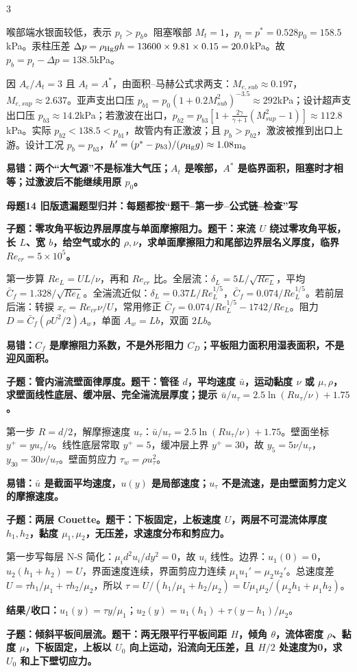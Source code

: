 \documentclass[a4paper]{article}
\newcommand{\mt}[1]{\vspace{0.22pt}\colorbox{M}{\parbox{\dimexpr\linewidth-2\fboxsep}{\color{white}\bfseries #1}}\par}
\newcommand{\qt}[1]{\vspace{0.10pt}\colorbox{Q}{\parbox{\dimexpr\linewidth-2\fboxsep}{\color{white}\bfseries #1}}\par}
\newcommand{\ans}[1]{\colorbox{G}{\parbox{\dimexpr\linewidth-2\fboxsep}{#1}}\par}
\newcommand{\warn}[1]{\colorbox{Y}{\parbox{\dimexpr\linewidth-2\fboxsep}{\color{E}\bfseries #1}}\par}
\newcommand{\res}[1]{{\color{E}\bfseries 结果/收口：}#1\par}
\begin{document}
\begin{multicols}{3}
\ans{喉部端水银面较低，表示 $p_t>p_b$。阻塞喉部 $M_t=1$，$p_t=p^*=0.528p_0=158.5$kPa。汞柱压差 $\Delta p=\rho_{\rm Hg}gh=13600\times9.81\times0.15=20.0$kPa。故 $p_b=p_t-\Delta p=138.5$kPa。}
\ans{因 $A_e/A_t=3$ 且 $A_t=A^*$，由面积--马赫公式求两支：$M_{e,sub}\approx0.197$，$M_{e,sup}\approx2.637$。亚声支出口压 $p_{b1}=p_0(1+0.2M_{sub}^2)^{-3.5}\approx292$kPa；设计超声支出口压 $p_{b3}\approx14.2$kPa；若激波在出口，$p_{b2}=p_{b3}[1+\frac{2\gamma}{\gamma+1}(M_{sup}^2-1)]\approx112.8$kPa。实际 $p_{b2}<138.5<p_{b1}$，故管内有正激波；且 $p_b>p_{b2}$，激波被推到出口上游。设计工况 $p_b=p_{b3}$，$h'=(p^*-p_{b3})/(\rho_{\rm Hg}g)\approx1.08$m。}
\warn{易错：两个“大气源”不是标准大气压；$A_t$ 是喉部，$A^*$ 是临界面积，阻塞时才相等；过激波后不能继续用原 $p_0$。}

\mt{母题14 旧版遗漏题型归并：每题都按“题干--第一步--公式链--检查”写}
\qt{子题：零攻角平板边界层厚度与单面摩擦阻力。题干：来流 $U$ 绕过零攻角平板，长 $L$、宽 $b$，给空气或水的 $\rho,\nu$，求单面摩擦阻力和尾部边界层名义厚度，临界 $Re_{cr}=5\times10^5$。}
\ans{第一步算 $Re_L=UL/\nu$，再和 $Re_{cr}$ 比。全层流：$\delta_L=5L/\sqrt{Re_L}$，平均 $\bar C_f=1.328/\sqrt{Re_L}$。全湍流近似：$\delta_L=0.37L/Re_L^{1/5}$，$\bar C_f=0.074/Re_L^{1/5}$。若前层后湍：转捩 $x_c=Re_{cr}\nu/U$，常用修正 $\bar C_f=0.074/Re_L^{1/5}-1742/Re_L$。阻力 $D=\bar C_f(\rho U^2/2)A_w$，单面 $A_w=Lb$，双面 $2Lb$。}
\warn{易错：$C_f$ 是摩擦阻力系数，不是外形阻力 $C_D$；平板阻力面积用湿表面积，不是迎风面积。}
\qt{子题：管内湍流壁面律厚度。题干：管径 $d$，平均速度 $\bar u$，运动黏度 $\nu$ 或 $\mu,\rho$，求壁面线性底层、缓冲层、完全湍流层厚度；提示 $\bar u/u_\tau=2.5\ln(Ru_\tau/\nu)+1.75$。}
\ans{第一步 $R=d/2$，解摩擦速度 $u_\tau$：$\bar u/u_\tau=2.5\ln(Ru_\tau/\nu)+1.75$。壁面坐标 $y^+=yu_\tau/\nu$。线性底层常取 $y^+=5$，缓冲层上界 $y^+=30$，故 $y_5=5\nu/u_\tau$，$y_{30}=30\nu/u_\tau$。壁面剪应力 $\tau_w=\rho u_\tau^2$。}
\warn{易错：$\bar u$ 是截面平均速度，$u(y)$ 是局部速度；$u_\tau$ 不是流速，是由壁面剪力定义的摩擦速度。}
\qt{子题：两层 Couette。题干：下板固定，上板速度 $U$，两层不可混流体厚度 $h_1,h_2$，黏度 $\mu_1,\mu_2$，无压差，求速度分布和剪应力。}
\ans{第一步写每层 N-S 简化：$\mu_i d^2u_i/dy^2=0$，故 $u_i$ 线性。边界：$u_1(0)=0$，$u_2(h_1+h_2)=U$，界面速度连续，界面剪应力连续 $\mu_1u_1'=\mu_2u_2'$。总速度差 $U=\tau h_1/\mu_1+\tau h_2/\mu_2$，所以 $\tau=U/(h_1/\mu_1+h_2/\mu_2)=U\mu_1\mu_2/(\mu_2h_1+\mu_1h_2)$。}
\res{$u_1(y)=\tau y/\mu_1$；$u_2(y)=u_1(h_1)+\tau(y-h_1)/\mu_2$。}
\qt{子题：倾斜平板间层流。题干：两无限平行平板间距 $H$，倾角 $\theta$，流体密度 $\rho$、黏度 $\mu$，下板固定，上板以 $U_0$ 向上运动，沿流向无压差，且 $H/2$ 处速度为0，求 $U_0$ 和上下壁切应力。}

\end{multicols}
\end{document}
